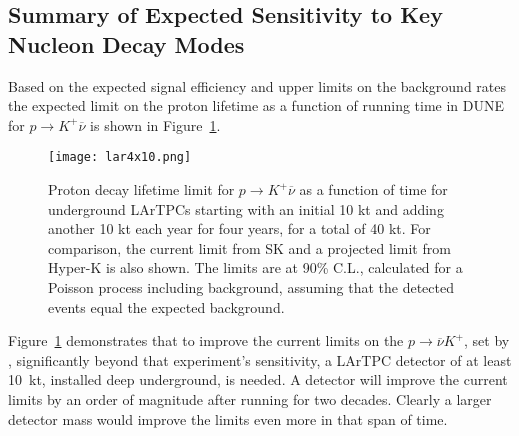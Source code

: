 \subsection{\boldmath Summary of Expected Sensitivity to Key Nucleon Decay Modes}

Based on the expected signal efficiency and upper limits on the
background rates the expected limit on the proton
lifetime as a function of running time in DUNE for $p \rightarrow K^+
\overline{\nu}$ is shown in Figure~\ref{fig:kdklimit}. 
\begin{figure}[!htb]
\centering
\texttt{[image: lar4x10.png]}
\caption[Proton decay lifetime limit for $p \rightarrow K^+ \overline{\nu}$
  versus time]{Proton decay lifetime limit for $p
  \rightarrow K^+ \overline{\nu}$ as a function of time for
  underground LArTPCs starting with an initial 10 kt and adding another 10 kt
each year for four years, for a total of 40 kt. 
  For comparison, the current limit from SK and a projected limit from Hyper-K 
is also shown.
  The limits are at 90\% C.L., calculated for
  a Poisson process including background, assuming that the detected events
  equal the expected background.}
\label{fig:kdklimit}
\end{figure}
%
Figure~\ref{fig:kdklimit} demonstrates that 
to improve the current limits on
the $p \rightarrow \overline{\nu} K^+$, set by \superk, significantly
beyond that experiment's sensitivity, 
a LArTPC
detector of at least 10~kt, installed deep underground, is needed.
A  detector will improve the current limits by an order of
magnitude after running for two decades.  Clearly a larger detector
mass would improve the limits even more in that span of time.

